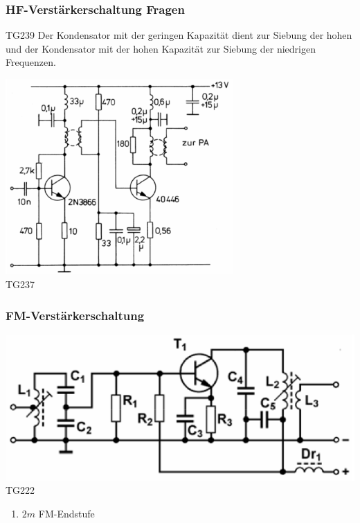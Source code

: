 \begin{frame}
    \frametitle{HF-Verstärkerschaltung Fragen}
        \begin{center}
        \begin{block}{TG239}
		\large Der Kondensator mit der geringen Kapazität dient zur Siebung der hohen und der Kondensator mit der hohen Kapazität zur Siebung der niedrigen Frequenzen.
    	\end{block}
        \includegraphics[width=0.65\textwidth]{a07/TG237.png}\\
        \tiny TG237 \hyperlink{refs}{\cite{bna}}
    \end{center}
\end{frame}

\begin{frame}
    \frametitle{FM-Verstärkerschaltung}
    \begin{center}
        \includegraphics[width=1\textwidth]{a07/TG222.png}\\
        \tiny TG222 \hyperlink{refs}{\cite{bna}}
     	\begin{enumerate} \Large
			\item $2m$ FM-Endstufe
    	\end{enumerate}
    \end{center}
\end{frame}

